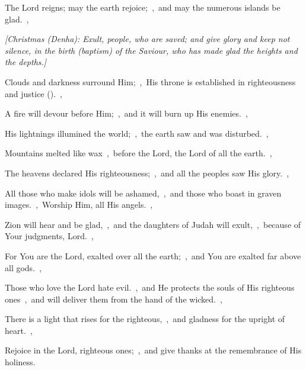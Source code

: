 \documentclass[12pt,twoside,a5paper]{article}
\begin{document}
\begin{normalparskip}
  The Lord reigns; may the earth rejoice;~\sep\ and may the numerous islands be glad.~\sep


  \emph{[Christmas (Denha): Exult, people, who are saved; and give glory and keep not silence, in the birth (baptism) of the Saviour, who has made glad the heights and the depths.]}

  Clouds and darkness surround Him;~\sep\ His throne is established in righteousness and justice ().~\sep

  A fire will devour before Him;~\sep\ and it will burn up His enemies.~\sep

  His lightnings illumined the world;~\sep\ the earth saw and was disturbed.~\sep

  Mountains melted like wax~\sep\ before the Lord, the Lord of all the earth.~\sep

  The heavens declared His righteousness;~\sep\ and all the peoples saw His glory.~\sep

  All those who make idols will be ashamed,~\sep\ and those who boast in graven images.~\sep\ Worship Him, all His angels.~\sep

  Zion will hear and be glad,~\sep\ and the daughters of Judah will exult,~\sep\ because of Your judgments, Lord.~\sep

  For You are the Lord, exalted over all the earth;~\sep\ and You are exalted far above all gods.~\sep

  Those who love the Lord hate evil.~\sep\ and He protects the souls of His righteous ones~\sep\ and will deliver them from the hand of the wicked.~\sep

  There is a light that rises for the righteous,~\sep\ and gladness for the upright of heart.~\sep

  Rejoice in the Lord, righteous ones;~\sep\ and give thanks at the remembrance of His holiness.
\end{normalparskip}

\end{document}
